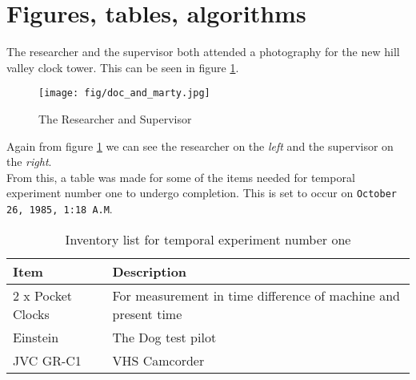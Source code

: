 \section{Figures, tables, algorithms}
\label{sec: figs tables algos}

The researcher and the supervisor both attended a photography for the new hill valley clock tower. This can be seen in figure \ref{fig:clock tower photo}.

\begin{figure}[h!]
    \centering
    \texttt{[image: fig/doc\_and\_marty.jpg]}
    \caption{The Researcher and Supervisor}
    \label{fig:clock tower photo}
\end{figure}

\noindent Again from figure \ref{fig:clock tower photo} we can see the researcher on the \textit{left} and the supervisor on the \textit{right}.\\

From this, a table was made for some of the items needed for temporal experiment number one to undergo completion. This is set to occur on \texttt{October 26, 1985, 1:18 A.M}.

\begin{table}[H] 
\begin{tabularx}{\textwidth}{| X | X |}
    \hline
     Item & Description  \\ \hline
     2 x Pocket Clocks & For measurement in time difference of machine and present time \\ \hline
     Einstein & The Dog test pilot \\ \hline
     JVC GR-C1 & VHS Camcorder \\ \hline
\end{tabularx}
\caption{Inventory list for temporal experiment number one}
\label{table: inventory}
\end{table}
